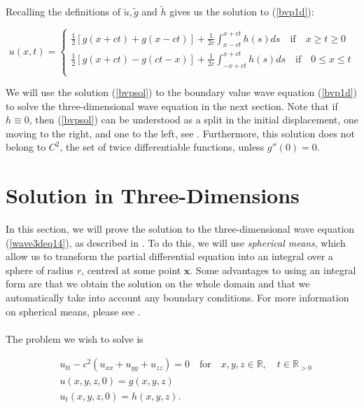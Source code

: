 \documentclass[a4paper, 12pt]{article}
\numberwithin{equation}{section}
\begin{document}
Recalling the definitions of $\tilde{u}, \tilde{g}$ and $\tilde{h}$ gives us the solution to (\ref{bvp1d}):

\begin{equation} \label{bvpsol}
    u(x,t)=
    \begin{cases}
        \frac{1}{2}\left[g(x+ct)+g(x-ct)\right]+\frac{1}{2c}\int^{x+ct}_{x-ct}h(s)ds \quad \textrm{if} \quad x \ge t \ge 0\\
        \frac{1}{2}\left[g(x+ct)-g(ct-x)\right]+\frac{1}{2c}\int^{x+ct}_{-x+ct}h(s)ds \quad \textrm{if} \quad 0 \le x \le t\\
    \end{cases}
\end{equation}

We will use the solution (\ref{bvpsol}) to the boundary value wave equation (\ref{bvp1d}) to solve the three-dimensional wave equation in 
the next section. Note that if $h \equiv 0$, then (\ref{bvpsol}) can be understood as a split in the initial displacement, one moving
to the right, and one to the left, see \cite{Ev}. Furthermore, this solution does not belong to $C^2$, the set of twice differentiable functions, 
unless $g''(0)=0$.

\section{Solution in Three-Dimensions} \label{sec3d}
In this section, we will prove the solution to the three-dimensional wave equation (\ref{wave3deq14}), as described in \cite[Chap. 2.4]{Ev}. To do this, we will use \emph{spherical
means}, which allow us to transform the partial differential equation into an integral over a sphere of radius $r$, centred at some point $\boldsymbol{x}$. 
Some advantages to using an integral form are that we obtain the solution on the whole domain and that we automatically take into account any
boundary conditions. For more information on spherical means, please see \cite{Sab}. 
\\
\\

The problem we wish to solve is

\begin{equation} \label{3deq}
\begin{aligned}
    &u_{tt}-c^2(u_{xx}+u_{yy}+u_{zz})=0 \quad \textrm {for} \quad x, y, z \in \mathbb{R}, \quad t \in \mathbb{R}_{>0}\\
    &u(x, y, z,0)=g(x,y,z)\\
    &u_t(x,y,z,0)=h(x,y,z).\\
\end{aligned}
\end{equation}
\end{document}

